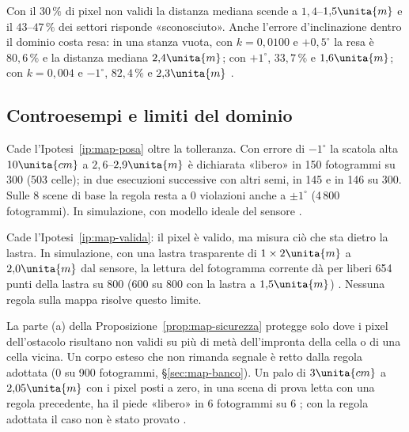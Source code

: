 Con il $30\,\%$ di pixel non validi la distanza mediana scende a $1{,}4$–$1{,}5\unita{m}$ e il $43$–$47\,\%$ dei settori risponde «sconosciuto». Anche l'errore d'inclinazione dentro il dominio costa resa: in una stanza vuota, con $k=0{,}0100$ e $+0{,}5^\circ$ la resa è $80{,}6\,\%$ e la distanza mediana $2{,}4\unita{m}$; con $+1^\circ$, $33{,}7\,\%$ e $1{,}6\unita{m}$; con $k=0{,}004$ e $-1^\circ$, $82{,}4\,\%$ e $2{,}3\unita{m}$ .

\subsection{Controesempi e limiti del dominio}\label{sec:map-controesempi}

\begin{controesempio}\label{cex:map-inclinazione}
Cade l'Ipotesi~\ref{ip:map-posa} oltre la tolleranza. Con errore di $-1^\circ$ la scatola alta $10\unita{cm}$ a $2{,}6$–$2{,}9\unita{m}$ è dichiarata «libero» in 150 fotogrammi su 300 (503 celle); in due esecuzioni successive con altri semi, in 145 e in 146 su 300. Sulle 8 scene di base la regola resta a 0 violazioni anche a $\pm1^\circ$ (4\,800 fotogrammi). In simulazione, con modello ideale del sensore .
\end{controesempio}

\begin{controesempio}\label{cex:map-vetro}
Cade l'Ipotesi~\ref{ip:map-valida}: il pixel è valido, ma misura ciò che sta dietro la lastra. In simulazione, con una lastra trasparente di $1\times2\unita{m}$ a $2{,}0\unita{m}$ dal sensore, la lettura del fotogramma corrente dà per liberi 654 punti della lastra su 800 (600 su 800 con la lastra a $1{,}5\unita{m}$) . Nessuna regola sulla mappa risolve questo limite.
\end{controesempio}

\begin{controesempio}\label{cex:map-muto}
La parte (a) della Proposizione~\ref{prop:map-sicurezza} protegge solo dove i pixel dell'ostacolo risultano non validi su più di metà dell'impronta della cella o di una cella vicina. Un corpo esteso che non rimanda segnale è retto dalla regola adottata (0 su 900 fotogrammi, \S\ref{sec:map-banco}). Un palo di $3\unita{cm}$ a $2{,}05\unita{m}$ con i pixel posti a zero, in una scena di prova letta con una regola precedente, ha il piede «libero» in 6 fotogrammi su 6 ; con la regola adottata il caso non è stato provato .
\end{controesempio}

